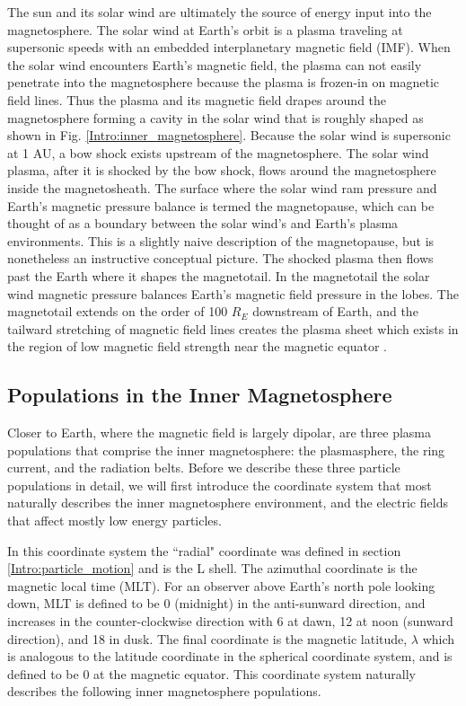 The sun and its solar wind are ultimately the source of energy input into the magnetosphere. The solar wind at Earth's orbit is a plasma traveling at supersonic speeds with an embedded interplanetary magnetic field (IMF). When the solar wind encounters Earth's magnetic field, the plasma can not easily penetrate into the magnetosphere because the plasma is frozen-in on magnetic field lines. Thus the plasma and its magnetic field drapes around the magnetosphere forming a cavity in the solar wind that is roughly shaped as shown in Fig. \ref{Intro:inner_magnetosphere}. Because the solar wind is supersonic at 1 AU, a bow shock exists upstream of the magnetosphere. The solar wind plasma, after it is shocked by the bow shock, flows around the magnetosphere inside the magnetosheath. The surface where the solar wind ram pressure and Earth's magnetic pressure balance is termed the magnetopause, which can be thought of as a boundary between the solar wind's and Earth's plasma environments. This is a slightly naive description of the magnetopause, but is nonetheless an instructive conceptual picture. The shocked plasma then flows past the Earth where it shapes the magnetotail. In the magnetotail the solar wind magnetic pressure balances Earth's magnetic field pressure in the lobes. The magnetotail extends on the order of 100 $R_E$ downstream of Earth, and the tailward stretching of magnetic field lines creates the plasma sheet which exists in the region of low magnetic field strength near the magnetic equator \citep[e.g.][]{Eastwood2015}.

\subsection{Populations in the Inner Magnetosphere}\label{Intro:inner_mag}
Closer to Earth, where the magnetic field is largely dipolar, are three plasma populations that comprise the inner magnetosphere: the plasmasphere, the ring current, and the radiation belts. Before we describe these three particle populations in detail, we will first introduce the coordinate system that most naturally describes the inner magnetosphere environment, and the electric fields that affect mostly low energy particles.

In this coordinate system the ``radial" coordinate was defined in section \ref{Intro:particle_motion} and is the L shell. The azimuthal coordinate is the magnetic local time (MLT). For an observer above Earth's north pole looking down, MLT is defined to be 0 (midnight) in the anti-sunward direction, and increases in the counter-clockwise direction with 6 at dawn, 12 at noon (sunward direction), and 18 in dusk. The final coordinate is the magnetic latitude, $\lambda$ which is analogous to the latitude coordinate in the spherical coordinate system, and is defined to be 0 at the magnetic equator. This coordinate system naturally describes the following inner magnetosphere populations.

